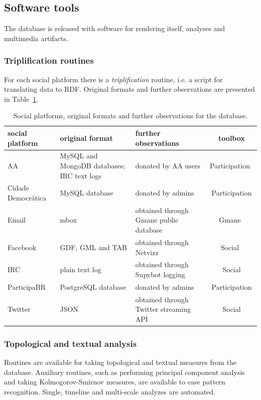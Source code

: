 \documentclass[review]{elsarticle}
\begin{document}
\subsection{Software tools}
The database is released with software for rendering itself, analyses and
multimedia artifacts.
\subsubsection{Triplification routines}
For each social platform there is a \emph{triplification} routine,
i.e. a script for translating data to RDF.
Original formats and further observations are presented in
Table~\ref{tab:provenance}.
\begin{table}[h!]\scriptsize
\begin{center}
\caption{Social platforms, original formats and further observations for
the database.}\label{tab:provenance}
\begin{tabular}{| l || p{3cm} | p{3cm} | c |}\hline
    \textbf{social platform} & \textbf{original format} & \textbf{further observations} & \textbf{toolbox} \\\hline\hline
    AA & MySQL and MongoDB databases; IRC text logs & donated by AA users & Participation~\cite{participation} \\\hline
    Cidade Democrática & MySQL database & donated by admins & Participation \\\hline
    Email & mbox & obtained through Gmane public database & Gmane~\cite{gmane} \\\hline
    Facebook & GDF, GML and TAB & obtained through Netvizz~\cite{netvizz} & Social~\cite{social} \\\hline
    IRC & plain text log & obtained through Supybot logging & Social \\\hline
    ParticipaBR & PostgreSQL database & donated by admins & Participation \\\hline
    Twitter & JSON & obtained through Twitter streaming API & Social \\\hline
\end{tabular}\end{center}
\end{table}                    
\subsubsection{Topological and textual analysis}\label{ana}
Routines are available for taking topological and textual measures from
the database.
Auxiliary routines, such as performing principal component analysis
and taking Kolmogorov-Smirnov measures, are available
to ease pattern recognition.
Single, timeline and multi-scale analyzes are automated.
\end{document}

